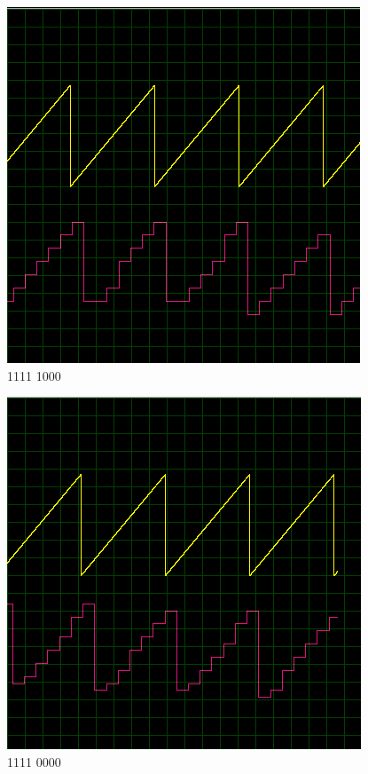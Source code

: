 \begin{multicols}{2}
\begin{figure}[H]
\includegraphics[width=0.8\linewidth]{ImagenesEjercicio1/bit3.png}
\caption{1111 1000}
\end{figure}
\begin{figure}[H]
\centering
\includegraphics[width=0.8\linewidth]{ImagenesEjercicio1/bit4.png}
\caption{1111 0000}
\end{figure}
\begin{figure}[H]
\centering

\end{figure}
\end{multicols}
